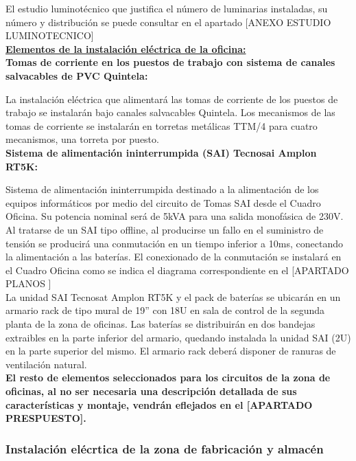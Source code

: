 El estudio luminotécnico que justifica el número de luminarias instaladas, su número y distribución se puede consultar en el apartado [ANEXO ESTUDIO LUMINOTECNICO]\\

\underline{\bfseries Elementos de la instalación eléctrica de la oficina:}\\


{\bfseries Tomas de corriente en los puestos de trabajo con sistema de canales salvacables de PVC Quintela:}

La instalación eléctrica que alimentará las tomas de corriente de los puestos de trabajo se instalarán bajo canales salvacables Quintela. Los mecanismos de las tomas de corriente se instalarán en torretas metálicas TTM/4 para cuatro mecanismos, una torreta por puesto.\\

{\bfseries Sistema de alimentación ininterrumpida (SAI) Tecnosai Amplon RT5K:}

Sistema de alimentación ininterrumpida destinado a la alimentación de los equipos informáticos por medio del circuito de Tomas SAI desde el Cuadro Oficina. Su potencia nominal será de 5kVA para una salida monofásica de 230V.\\ 

Al tratarse de un SAI tipo offline, al producirse un fallo en el suministro de tensión se producirá una conmutación en un tiempo inferior a 10ms, conectando la alimentación a las baterías. El conexionado de la conmutación se instalará en el Cuadro Oficina como se indica el diagrama correspondiente en el [APARTADO PLANOS ]\\

La unidad SAI Tecnosat Amplon RT5K y el pack de baterías se ubicarán en un armario rack de tipo mural de 19'' con 18U en sala de control de la segunda planta de la zona de oficinas. Las baterías se distribuirán en dos bandejas extraibles en la parte inferior del armario, quedando instalada la unidad SAI (2U) en la parte superior del mismo. El armario rack deberá disponer de ranuras de ventilación natural.\\



{\bfseries El resto de elementos seleccionados para los circuitos de la zona de oficinas, al no ser necesaria una descripción detallada de sus características y montaje, vendrán eflejados en el [APARTADO PRESPUESTO].}

\subsubsection{Instalación elécrtica de la zona de fabricación y almacén}

